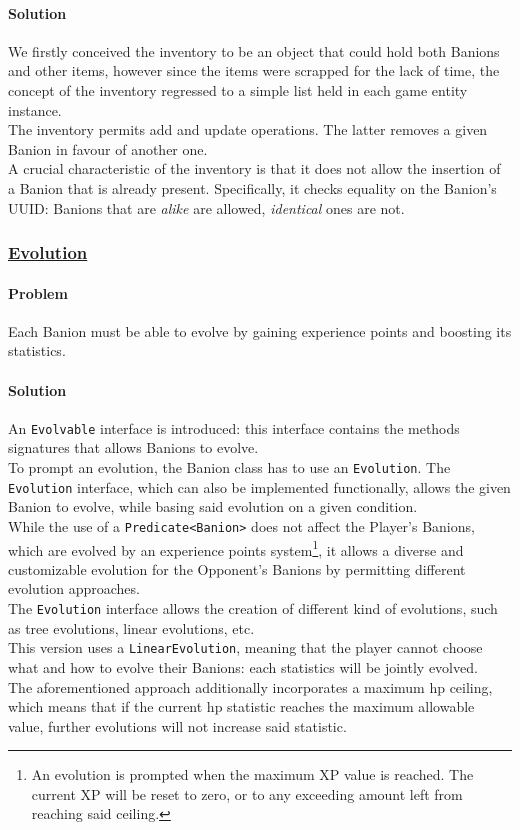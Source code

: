\documentclass[12pt, a4paper]{report}
\theoremstyle{definition}
\begin{document}
    \paragraph{Solution}
    We firstly conceived the inventory to be an object that could hold both Banions and other items, however since the items were scrapped for the lack of time,
    the concept of the inventory regressed to a simple list held in each game entity instance.\\
    The inventory permits add and update operations. The latter removes a given Banion in favour of another one.\\
    A crucial characteristic of the inventory is that it does not allow the insertion of a Banion that is already present. Specifically, it checks equality on the
    Banion's UUID: Banions that are \textit{alike} are allowed, \textit{identical} ones are not.

    \subsubsection{\underline{Evolution}}
    \paragraph{Problem}
    Each Banion must be able to evolve by gaining experience points and boosting its statistics.
    \paragraph{Solution}
    An \verb|Evolvable| interface is introduced: this interface contains the methods signatures that allows Banions to evolve.\\
    To prompt an evolution, the Banion class has to use an \verb|Evolution|.
    The \verb|Evolution| interface, which can also be implemented functionally, allows the given Banion to evolve, while basing said evolution
    on a given condition.\\
    While the use of a \verb|Predicate<Banion>| does not affect the Player's Banions, which are evolved by an experience points system\footnote{An evolution
    is prompted when the maximum XP value is reached. The current XP will be reset to zero, or to any exceeding amount left from reaching said ceiling.},
    it allows a diverse and customizable evolution for the Opponent's Banions by permitting different evolution approaches.\\
    The \verb|Evolution| interface allows the creation of different kind of evolutions, such as tree evolutions, linear evolutions, etc.\\
    This version uses a \verb|LinearEvolution|, meaning that the player cannot choose what and how to evolve their Banions: each statistics will be
    jointly evolved.\\
    The aforementioned approach additionally incorporates a maximum hp ceiling, which means that if the current hp statistic reaches the maximum allowable value,
    further evolutions will not increase said statistic.
\end{document}
